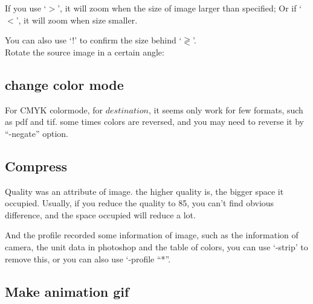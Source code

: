 \documentclass[12pt]{article}
\begin{document}
{\centering{}\par}\vspace{5mm}

If you use `$>$', it will zoom when the size of image larger than specified; Or if `$<$', it will zoom when size smaller.

You can also use `!' to confirm the size behind `$\gtrless$'.\\

Rotate the source image in a certain angle:\vspace{5mm}

{\centering{}\par}

\subsection{change color mode}

{\centering{}\par}\vspace{5mm}

For CMYK colormode, for $destination$, it seems only work for few formats, such as pdf and tif. some times colors are reversed, and you may need to reverse it by ``-negate'' option.

\subsection{Compress}
{\centering{}\par}\vspace{5mm}

Quality was an attribute of image. the higher quality is, the bigger space it occupied. Usually, if you reduce the quality to 85, you can't find obvious difference, and the space occupied will reduce a lot.

And the profile recorded some information of image, such as the information of camera, the unit data in photoshop and the table of colors, you can use `-strip' to remove this, or you can also use `-profile ``*''.

\subsection{Make animation gif}
{\centering{}\par}\vspace{5mm}
\end{document}
